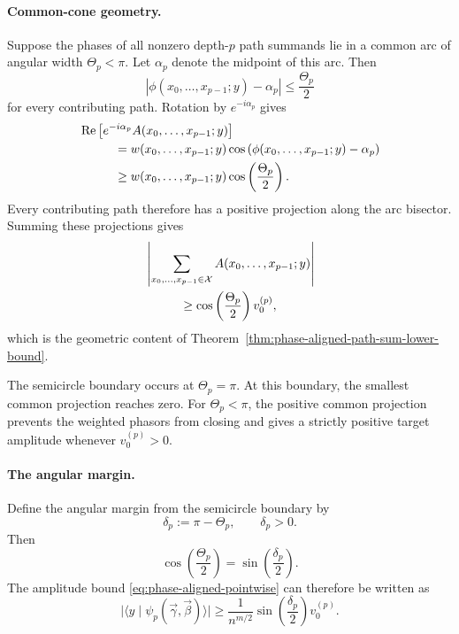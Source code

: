 \documentclass[a4paper,onecolumn,11pt,unpublished]{quantumarticle}
\theoremstyle{remark}
\begin{document}
\paragraph{Common-cone geometry.}

Suppose the phases of all nonzero depth-\(p\) path summands lie in a
common arc of angular width \(\Theta_p<\pi\). Let \(\alpha_p\) denote the
midpoint of this arc. Then
\begin{equation}
\label{eq:path-phase-common-arc}
\left|
\phi(x_0,\ldots,x_{p-1};y)-\alpha_p
\right|
\le
\frac{\Theta_p}{2}
\end{equation}
for every contributing path. Rotation by \(e^{-i\alpha_p}\) gives
\begin{align}
\label{eq:path-common-projection}
&
\operatorname{Re}
\left[
e^{-i\alpha_p}
A(x_0,\ldots,x_{p-1};y)
\right]
\notag\\
&\hspace{1cm}
=
w(x_0,\ldots,x_{p-1};y)
\cos
\left(
\phi(x_0,\ldots,x_{p-1};y)-\alpha_p
\right)
\notag\\
&\hspace{1cm}
\ge
w(x_0,\ldots,x_{p-1};y)
\cos
\left(
\frac{\Theta_p}{2}
\right).
\end{align}
Every contributing path therefore has a positive projection along the
arc bisector. Summing these projections gives
\begin{align}
\label{eq:path-cone-projection-sum}
&
\left|
\sum_{x_0,\ldots,x_{p-1}\in\mathcal X}
A(x_0,\ldots,x_{p-1};y)
\right|
\notag\\
&\hspace{1cm}
\ge
\cos
\left(
\frac{\Theta_p}{2}
\right)
v_0^{(p)},
\end{align}
which is the geometric content of
Theorem~\ref{thm:phase-aligned-path-sum-lower-bound}.

The semicircle boundary occurs at \(\Theta_p=\pi.\) At this boundary, the smallest common projection reaches zero. For \(\Theta_p<\pi\), the positive common projection prevents the weighted phasors from closing and gives a strictly positive target
amplitude whenever \(v_0^{(p)}>0\).

\paragraph{The angular margin.}

Define the angular margin from the semicircle boundary by
\[
\delta_p
:=
\pi-\Theta_p,
\qquad
\delta_p>0.
\]
Then
\begin{equation*}
\label{eq:cone-factor-angular-margin}
\cos
\left(
\frac{\Theta_p}{2}
\right)
=
\sin
\left(
\frac{\delta_p}{2}
\right).
\end{equation*}
The amplitude bound
\eqref{eq:phase-aligned-pointwise} can therefore be written as
\begin{equation}
\label{eq:angular-margin-amplitude-bound}
\bigl|
\langle y\mid
\psi_p(\vec\gamma,\vec\beta)
\rangle
\bigr|
\ge
\frac{1}{n^{m/2}}
\sin
\left(
\frac{\delta_p}{2}
\right)
v_0^{(p)}.
\end{equation}
\end{document}
